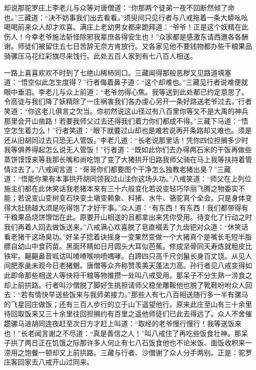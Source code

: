 \documentclass[12pt,UTF8]{ctexbook}
\begin{document}
却说那驼罗庄上李老儿与众等对唐僧道：“你那两个徒弟一夜不回断然倾了命也。”三藏道：“决不妨事我们出去看看。”须臾间只见行者与八戒拖着一条大蟒吆吆喝喝前来众人却才欢喜。满庄上老幼男女都来跪拜道：“爷爷！正是这个妖精在此伤人！今幸老爷施法斩怪除邪我辈庶各得安生也！”众家都是感激东请西邀各各酬谢。师徒们被留住五七日苦辞无奈方肯放行。又各家见他不要钱物都办些干粮果品骑骡压马花红彩旗尽来饯行。此处五百人家到有七八百人相送。

一路上喜喜欢欢不时到了七绝山稀柿同口。三藏闻得那般恶秽又见路道填塞道：“悟空似此怎生度得？”行者侮着鼻子道：“这个却难也。”三藏见行者说难便就眼中垂泪。李老儿与众上前道：“老爷勿得心焦。我等送到此处都已约定意思了。令高徒与我们降了妖精除了一庄祸害我们各办虔心另开一条好路送老爷过去。”行者笑道：“你这老儿俱言之欠当。你初然说这山径过有八百里你等又不是大禹的神兵那里会开山凿路！若要我师父过去还得我们着力你们都成不得。”三藏下马道：“悟空怎生着力么！”行者笑道：“眼下就要过山却也是难若说再开条路却又难也。须是还从旧胡同过去只恐无人管饭。”李老儿道：“长老说那里话！凭你四位担搁多少时我等俱养得起怎么说无人管饭！”行者道：“既如此你们去办得两石米的干饭再做些蒸饼馍馍来等我那长嘴和尚吃饱了变了大猪拱开旧路我师父骑在马上我等扶持着管情过去了。”八戒闻言道：“哥哥你们都要图个干净怎么独教老猪出臭？”三藏道：“悟能你果有本事拱开胡同领我过山注你这场头功。”八戒笑道：“师父在上列位施主们都在此休笑话我老猪本来有三十六般变化若说变轻巧华丽飞腾之物委实不能；若说变山变树变石块变土墩变赖象、科猪、水牛、骆驼真个全会。只是身体变得大肚肠越大须是吃得饱了才好干事。”众人道：“有东西！有东西！我们都带得有干粮果品烧饼馉饳在此。原要开山相送的且都拿出来凭你受用。待变化了行动之时我们再着人回去做饭送来。”八戒满心欢喜脱了皂直裰丢了九齿钯对众道：“休笑话看老猪干这场臭功。”好呆子捻着诀摇身一变果然变做一个大猪真个是嘴长毛短半脂膘自幼山中食药苗。黑面环睛如日月圆头大耳似芭蕉。修成坚骨同天寿炼就粗皮比铁牢。齆齆鼻音呱诂叫喳喳喉响喷喁哮。白蹄四只高千尺剑鬣长身百丈饶。从见人间肥豕彘未观今日老猪魈。唐僧等众齐称赞羡美天蓬法力高。孙行者见八戒变得如此即命那些相送人等快将干粮等物推攒一处叫八戒受用。那呆子不分生熟一涝食之却上前拱路。行者叫沙僧脱了脚好生挑担请师父稳坐雕鞍他也脱了靴鞋吩咐众人回去：“若有情快早送些饭来与我师弟接力。”那些人有七八百相送随行多一半有骡马的飞星回庄做饭；还有三百人步行的立于山下遥望他行。原来此庄至山有三十余里待回取饭来又三十余里往回担搁约有百里之遥他师徒们已此去得远了。众人不舍催趱骡马进胡同连夜赶至次日方才赶上叫道：“取经的老爷慢行慢行！我等送饭来也！”长老闻言谢之不尽道：“真是善信之人！”叫八戒住了再吃些饭食壮神。那呆子拱了两日正在饥饿之际那许多人何止有七八石饭食他也不论米饭、面饭收积来一涝用之饱餐一顿却又上前拱路。三藏与行者、沙僧谢了众人分手两别。正是：驼罗庄客回家去八戒开山过同来。
\end{document}
